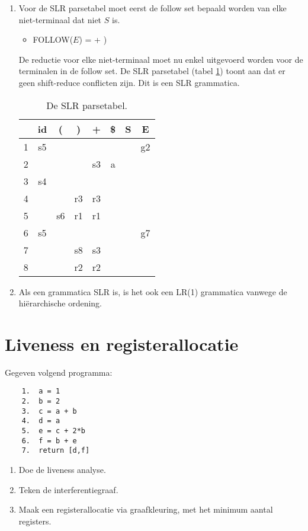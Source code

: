 \documentclass{report}
\begin{document}
{\begin{enumerate}
			\item Voor de SLR parsetabel moet eerst de follow set bepaald worden van elke niet-terminaal dat niet $S$ is.
			\begin{itemize}
				\item FOLLOW($E$) = + )
			\end{itemize}
			De reductie voor elke niet-terminaal moet nu enkel uitgevoerd worden voor de terminalen in de follow set. De SLR parsetabel (tabel \ref{SLRPARSETABEL}) toont aan dat er geen shift-reduce conflicten zijn. Dit is een SLR grammatica.
			\begin{table}[ht]
				\centering
				\begin{tabular}{c|ccccc|cc|}
					& id & ( & ) & + & \$ & S & E \\
					\hline 
					1 & s5 & & & & & & g2 \\
					2 & & & & s3 & a & & \\
					3 & s4 & & & & & & \\
					4 & & & r3 & r3 & & & \\
					5 & & s6 & r1 & r1 & & & \\
					6 & s5 & & & & & & g7 \\
					7 & & & s8 & s3 & & & \\
					8 & & & r2 & r2 & & & \\
					\hline
				\end{tabular}
				\caption{De SLR parsetabel.}
				\label{SLRPARSETABEL}
			\end{table}
			
			\item Als een grammatica SLR is, is het ook een LR(1) grammatica vanwege de hiërarchische ordening.  
			
		\end{enumerate}

	}
\newpage
\section{Liveness en registerallocatie}
	Gegeven volgend programma:
	\begin{lstlisting}
	1.  a = 1
	2.  b = 2
	3.  c = a + b
	4.  d = a
	5.  e = c + 2*b
	6.  f = b + e
	7.  return [d,f]
	\end{lstlisting}
	\begin{enumerate}
		\item Doe de liveness analyse.
		\item Teken de interferentiegraaf.
		\item Maak een registerallocatie via graafkleuring, met het minimum aantal registers.
	\end{enumerate}
\end{document}
